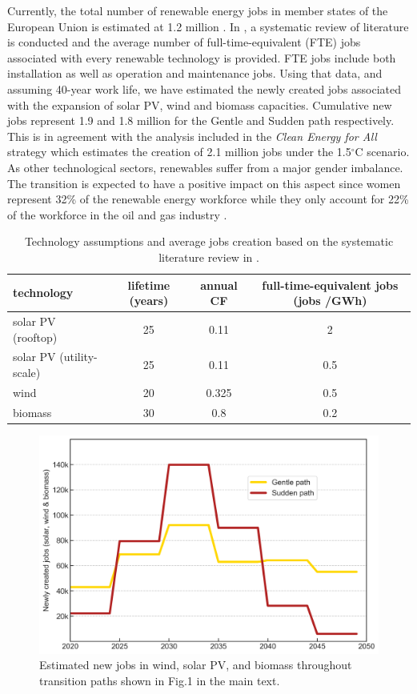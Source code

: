 \documentclass[3p]{elsarticle} %
\begin{document}
Currently, the total number of renewable energy jobs in member states of the European Union is estimated at 1.2 million \cite{IRENA_jobs}. In \cite{Low_carbon_jobs}, a systematic review of literature is conducted and the average number of full-time-equivalent (FTE) jobs associated with every renewable technology is provided. FTE jobs include both installation as well as operation and maintenance jobs.  Using that data, and assuming 40-year work life, we have estimated the newly created jobs associated with the expansion of solar PV, wind and biomass capacities. Cumulative new jobs represent 1.9 and 1.8 million for the Gentle and Sudden path respectively. This is in agreement with the analysis included in the \textsl{Clean Energy for All} strategy \cite{in-depth_2018} which estimates the creation of 2.1 million jobs under the 1.5$^{\circ}$C scenario. As other technological sectors, renewables suffer from a major gender imbalance. The transition is expected to have a positive impact on this aspect since women represent 32\% of the renewable energy workforce while they only account for 22\% of the workforce in the oil and gas industry \cite{IRENA_gender}. 

\begin{table}[!h]
\footnotesize
\centering
\begin{threeparttable}
\caption{Technology assumptions and average jobs creation based on the systematic literature review in \cite{Low_carbon_jobs}.} \label{tab_jobs}
\centering
\begin{tabularx}{13cm}{lccc}
\toprule
	technology & lifetime (years) &	annual CF &	full-time-equivalent jobs (jobs /GWh) \\
\midrule
solar PV (rooftop) 	& 25	& 0.11 &	2 \\
solar PV (utility-scale)	& 25	& 0.11 &	0.5 \\
wind	& 20	& 0.325 &	0.5 \\
biomass	& 30	& 0.8	& 0.2 \\
\bottomrule
\end{tabularx}
\end{threeparttable}
\end{table}

\begin{figure}[!h]
\centering
\includegraphics[width=0.7\columnwidth]{../figures/jobs.png}
\caption{Estimated new jobs in wind, solar PV, and biomass throughout transition paths shown in Fig.1 in the main text.} \label{fig_jobs} 
\end{figure}
\end{document}
